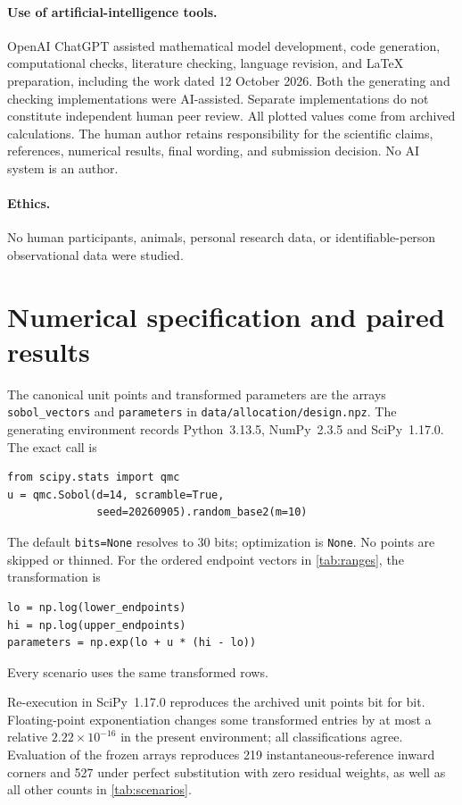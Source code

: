\paragraph{Use of artificial-intelligence tools.} OpenAI ChatGPT assisted mathematical model development, code generation, computational checks, literature checking, language revision, and LaTeX preparation, including the work dated 12 October 2026. Both the generating and checking implementations were AI-assisted. Separate implementations do not constitute independent human peer review. All plotted values come from archived calculations. The human author retains responsibility for the scientific claims, references, numerical results, final wording, and submission decision. No AI system is an author.

\paragraph{Ethics.} No human participants, animals, personal research data, or identifiable-person observational data were studied.

\appendix
\section{Numerical specification and paired results}
\label{app:numerical}

The canonical unit points and transformed parameters are the arrays
\texttt{sobol\_vectors} and \texttt{parameters} in
\texttt{data/allocation/design.npz}. The generating environment records
Python~3.13.5, NumPy~2.3.5 and SciPy~1.17.0. The exact call is
\begin{verbatim}
from scipy.stats import qmc
u = qmc.Sobol(d=14, scramble=True,
              seed=20260905).random_base2(m=10)
\end{verbatim}
The default \texttt{bits=None} resolves to 30 bits; optimization is
\texttt{None}. No points are skipped or thinned. For the ordered endpoint
vectors in \cref{tab:ranges}, the transformation is
\begin{verbatim}
lo = np.log(lower_endpoints)
hi = np.log(upper_endpoints)
parameters = np.exp(lo + u * (hi - lo))
\end{verbatim}
Every scenario uses the same transformed rows.

Re-execution in SciPy~1.17.0 reproduces the archived unit points bit for
bit. Floating-point exponentiation changes some transformed entries by
at most a relative $2.22\times10^{-16}$ in the present environment;
all classifications agree. Evaluation of the frozen arrays reproduces
219 instantaneous-reference inward corners and 527 under perfect
substitution with zero residual weights, as well as all other counts
in \cref{tab:scenarios}.


